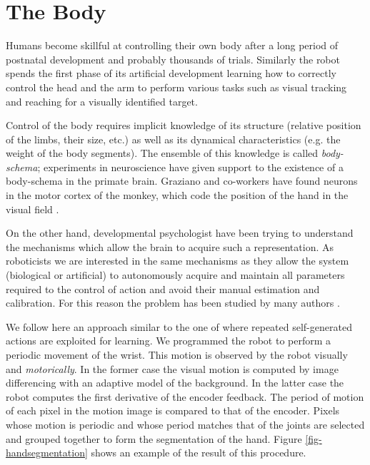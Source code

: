 \section{The Body}
\label{sect:body}

Humans become skillful at controlling their own body after a long period of postnatal development and probably thousands of trials. Similarly the robot spends the first phase of its artificial development learning how to correctly control the head and the arm to perform various tasks such as visual tracking and reaching for a visually identified target.

Control of the body requires implicit knowledge of its structure (relative position of the limbs, their size, etc.) as well as its dynamical characteristics (e.g. the weight of the body segments). The ensemble of this knowledge is called \emph{body-schema}; experiments in neuroscience have given support to the existence of a body-schema in the primate brain. Graziano and co-workers have found neurons in the motor cortex of the monkey, which code the position of the hand in the visual field \cite{graziano99whereis,graziano00coding}.

On the other hand, developmental psychologist have been trying to understand the mechanisms which allow the brain to acquire such a representation. As roboticists we are interested in the same mechanisms as they allow the system (biological or artificial) to autonomously acquire and maintain all parameters required to the control of action and avoid their manual estimation and calibration. For this reason the problem has been studied by many authors \cite{yoshikawa03doestheinvariance,fitzpatrick04feelthebeat,metta03early}.

We follow here an approach similar to the one of \cite{fitzpatrick04feelthebeat,metta03early} where repeated self-generated actions are exploited for learning. We programmed the robot to perform a periodic movement of the wrist. This motion is observed by the robot visually and \emph{motorically}. In the former case the visual motion is computed by image differencing with an adaptive model of the background. In the latter case the robot computes the first derivative of the encoder feedback. The period of motion of each pixel in the motion image is compared to that of the encoder. Pixels whose motion is periodic and whose period matches that of the joints are selected and grouped together to form the segmentation of the hand. Figure \ref{fig-handsegmentation} shows an example of the result of this procedure.

